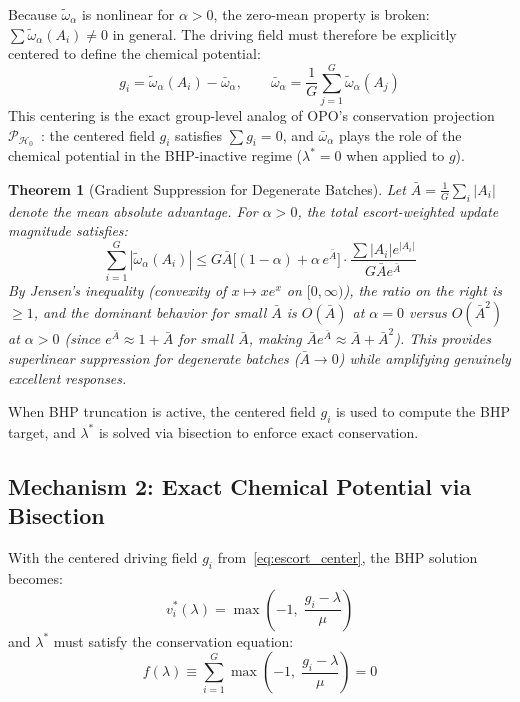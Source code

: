 \documentclass[11pt]{article}
\newtheorem{theorem}{Theorem}[section]
\theoremstyle{definition}
\theoremstyle{remark}
\begin{document}
Because $\tilde{\omega}_\alpha$ is nonlinear for $\alpha > 0$, the zero-mean property is broken: $\sum \tilde{\omega}_\alpha(A_i) \neq 0$ in general. The driving field must therefore be explicitly centered to define the chemical potential:
\begin{equation}
\label{eq:escort_center}
    g_i = \tilde{\omega}_\alpha(A_i) - \bar{\omega}_\alpha, \qquad \bar{\omega}_\alpha = \frac{1}{G}\sum_{j=1}^G \tilde{\omega}_\alpha(A_j)
\end{equation}
This centering is the exact group-level analog of OPO's conservation projection $\mathcal{P}_{\mathcal{H}_0}$~\cite{Wang2025OPO}: the centered field $g_i$ satisfies $\sum g_i = 0$, and $\bar{\omega}_\alpha$ plays the role of the chemical potential in the BHP-inactive regime ($\lambda^* = 0$ when applied to $g$).

\begin{theorem}[Gradient Suppression for Degenerate Batches]
\label{thm:suppression}
Let $\bar{A} = \frac{1}{G}\sum_i |A_i|$ denote the mean absolute advantage. For $\alpha > 0$, the total escort-weighted update magnitude satisfies:
\begin{equation}
    \sum_{i=1}^G |\tilde{\omega}_\alpha(A_i)| \leq G\bar{A}\big[(1-\alpha) + \alpha\,e^{\bar{A}}\big] \cdot \frac{\sum|A_i|e^{|A_i|}}{G\bar{A} e^{\bar{A}}}
\end{equation}
By Jensen's inequality (convexity of $x \mapsto x e^x$ on $[0,\infty)$), the ratio on the right is $\geq 1$, and the dominant behavior for small $\bar{A}$ is $O(\bar{A})$ at $\alpha = 0$ versus $O(\bar{A}^2)$ at $\alpha > 0$ (since $e^{\bar{A}} \approx 1 + \bar{A}$ for small $\bar{A}$, making $\bar{A} e^{\bar{A}} \approx \bar{A} + \bar{A}^2$). This provides superlinear suppression for degenerate batches ($\bar{A} \to 0$) while amplifying genuinely excellent responses.
\end{theorem}

When BHP truncation is active, the centered field $g_i$ is used to compute the BHP target, and $\lambda^*$ is solved via bisection to enforce exact conservation.

\subsection{Mechanism 2: Exact Chemical Potential via Bisection}
\label{subsec:bisection}

With the centered driving field $g_i$ from~\eqref{eq:escort_center}, the BHP solution becomes:
\begin{equation}
\label{eq:bhp_wgopo}
    v_i^*(\lambda) = \max\!\left(-1,\; \frac{g_i - \lambda}{\mu}\right)
\end{equation}
and $\lambda^*$ must satisfy the conservation equation:
\begin{equation}
\label{eq:conservation_eq}
    f(\lambda) \equiv \sum_{i=1}^G \max\!\left(-1,\; \frac{g_i - \lambda}{\mu}\right) = 0
\end{equation}
\end{document}
